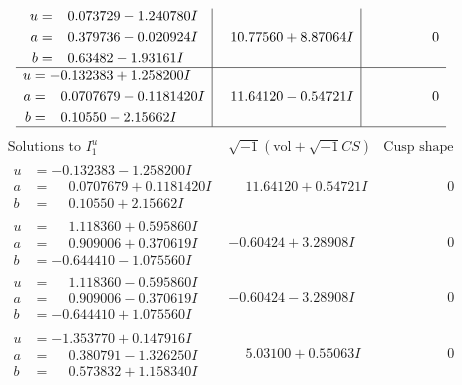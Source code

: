 \documentclass[1p]{elsarticle_modified}
\theoremstyle{definition}
\newcommand{\I}{\sqrt{-1}}
\begin{document}
$$\begin{array}{c|c|c}
\begin{aligned}
u &= \phantom{-}0.073729 - 1.240780 I \\
a &= \phantom{-}0.379736 - 0.020924 I \\
b &= \phantom{-}0.63482 - 1.93161 I\end{aligned}
 & \phantom{-}10.77560 + 8.87064 I & \phantom{-0.000000 } 0 \\ \hline\begin{aligned}
u &= -0.132383 + 1.258200 I \\
a &= \phantom{-}0.0707679 - 0.1181420 I \\
b &= \phantom{-}0.10550 - 2.15662 I\end{aligned}
 & \phantom{-}11.64120 - 0.54721 I & \phantom{-0.000000 } 0\\
 \hline 
 \end{array}$$\newpage$$\begin{array}{c|c|c}  
\text{Solutions to }I^u_{1}& \I (\text{vol} + \sqrt{-1}CS) & \text{Cusp shape}\\
 \hline 
\begin{aligned}
u &= -0.132383 - 1.258200 I \\
a &= \phantom{-}0.0707679 + 0.1181420 I \\
b &= \phantom{-}0.10550 + 2.15662 I\end{aligned}
 & \phantom{-}11.64120 + 0.54721 I & \phantom{-0.000000 } 0 \\ \hline\begin{aligned}
u &= \phantom{-}1.118360 + 0.595860 I \\
a &= \phantom{-}0.909006 + 0.370619 I \\
b &= -0.644410 - 1.075560 I\end{aligned}
 & -0.60424 + 3.28908 I & \phantom{-0.000000 } 0 \\ \hline\begin{aligned}
u &= \phantom{-}1.118360 - 0.595860 I \\
a &= \phantom{-}0.909006 - 0.370619 I \\
b &= -0.644410 + 1.075560 I\end{aligned}
 & -0.60424 - 3.28908 I & \phantom{-0.000000 } 0 \\ \hline\begin{aligned}
u &= -1.353770 + 0.147916 I \\
a &= \phantom{-}0.380791 - 1.326250 I \\
b &= \phantom{-}0.573832 + 1.158340 I\end{aligned}
 & \phantom{-}5.03100 + 0.55063 I & \phantom{-0.000000 } 0 \\ \hline\begin{aligned}

\end{aligned}
\end{array}$$
\end{document}

